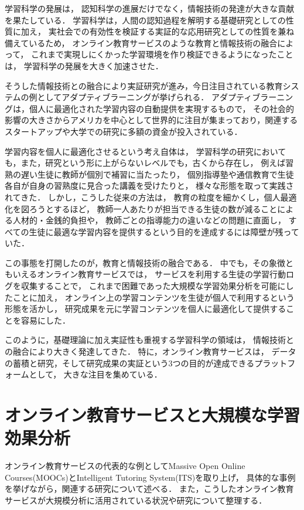 学習科学の発展は，
認知科学の進展だけでなく，情報技術の発達が大きな貢献を果たしている．
学習科学は，人間の認知過程を解明する基礎研究としての性質に加え，
実社会での有効性を検証する実証的な応用研究としての性質を兼ね備えているため，
オンライン教育サービスのような教育と情報技術の融合によって，
これまで実現しにくかった学習環境を作り検証できるようになったことは，
学習科学の発展を大きく加速させた．

そうした情報技術との融合により実証研究が進み，今日注目されている教育システムの例としてアダプティブラーニングが挙げられる\cite{carbonell1970ai, midgley2014goals}．
アダプティブラーニングは，個人に最適化された学習内容の自動提供を実現するもので，
その社会的影響の大きさからアメリカを中心として世界的に注目が集まっており，関連するスタートアップや大学での研究に多額の資金が投入されている\cite{piccioli2014learning}．

学習内容を個人に最適化させるという考え自体は，
学習科学の研究においても，また，研究という形に上がらないレベルでも，古くから存在し，
例えば習熟の遅い生徒に教師が個別で補習に当たったり，
個別指導塾や通信教育で生徒各自が自身の習熟度に見合った講義を受けたりと，
様々な形態を取って実践されてきた．
しかし，こうした従来の方法は，
教育の粒度を細かくし，個人最適化を図ろうとするほど，
教師一人あたりが担当できる生徒の数が減ることによる人材的・金銭的負担や，
教師ごとの指導能力の違いなどの問題に直面し，
すべての生徒に最適な学習内容を提供するという目的を達成するには障壁が残っていた．

この事態を打開したのが，教育と情報技術の融合である．
中でも，その象徴ともいえるオンライン教育サービスでは，
サービスを利用する生徒の学習行動ログを収集することで，
これまで困難であった大規模な学習効果分析を可能にしたことに加え，
オンライン上の学習コンテンツを生徒が個人で利用するという形態を活かし，
研究成果を元に学習コンテンツを個人に最適化して提供することを容易にした．


このように，基礎理論に加え実証性も重視する学習科学の領域は，
情報技術との融合により大きく発達してきた．
特に，オンライン教育サービスは，
データの蓄積と研究，そして研究成果の実証という3つの目的が達成できるプラットフォームとして，
大きな注目を集めている．



\section{オンライン教育サービスと大規模な学習効果分析}
オンライン教育サービスの代表的な例としてMassive Open Online Courses(MOOCs)とIntelligent Tutoring System(ITS)を取り上げ，
具体的な事例を挙げながら，関連する研究について述べる．
また，こうしたオンライン教育サービスが大規模分析に活用されている状況や研究について整理する．


